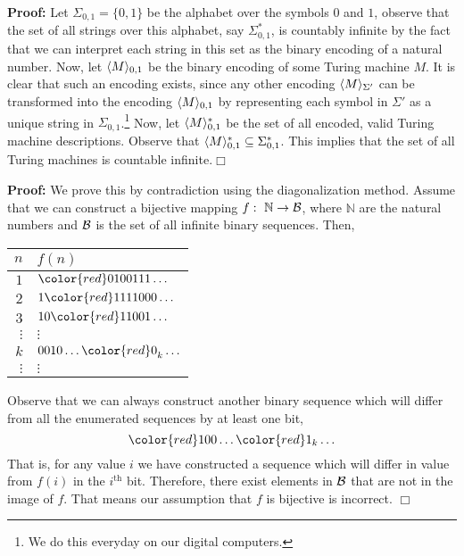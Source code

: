 \documentclass[a4paper,blends,pdf,colorBG,slideColor]{prosper}
\begin{document}

{\bf Proof:}  Let $\Sigma_{0,1} = \{ 0,1\}$ be the alphabet over the symbols $0$ and $1$, observe that the
set of all strings over this alphabet, say $\Sigma_{0,1}^*$, is countably infinite by the fact that
we can interpret each string in this set as the binary encoding of a natural number.
Now, let $\langle {M} \rangle_{0,1}$ be the binary encoding of some Turing machine $M$.  
It is clear that such an encoding exists, since any other encoding $\langle {M} \rangle_{\Sigma'}$
can be transformed into the encoding $\langle {M} \rangle_{0,1}$ by representing each
symbol in $\Sigma'$ as a unique string in $\Sigma_{0,1}$.\footnote{We do this everyday on our digital computers.}
Now, let $\langle {M} \rangle_{0,1}^*$ be the set of all encoded, valid Turing machine descriptions.
Observe that  $\langle {M} \rangle_{0,1}^*\subseteq \Sigma_{0,1}^*$.
This implies that the set of all Turing machines is countable infinite.$\Box$

\vspace{.5in}
\es


{\small
{}
}
{\scriptsize
{\bf Proof:} We prove this by contradiction using the diagonalization method.  Assume that we can construct
a bijective mapping $f\,\colon\; {\mathbb N} \rightarrow {\cal B}$, where $\mathbb N$ are the natural
numbers and $\cal B$ is the set of all infinite binary sequences.  Then,

{\tiny
\begin{center}
\begin{tabular}{r | l}
$n$ & $f(n)$ \\ \hline
$1$ & ${\color{red}0}100111\ldots$\\
$2$ & $1{\color{red}1}111000\ldots$\\
$3$ & $10{\color{red}1}1001\ldots$\\
$\vdots$ & $\vdots$\\
$k$ & $0010\ldots{\color{red}0}_k\ldots$\\
$\vdots$ & $\vdots$\\
\end{tabular}
\end{center}
}
Observe that we can always construct another binary sequence which will differ 
from all the enumerated sequences by at least one bit,
\[
{\color{red} 100}\ldots{\color{red}1_k}\ldots
\]
That is, for any value $i$ we have constructed a sequence which will differ in 
value from $f(i)$ in the $i^{\mbox{th}}$ bit.  Therefore, there exist
elements in $\cal B$ that are not in the image of $f$.  That means
our assumption that $f$ is bijective is incorrect. $\Box$
}
\es
\end{document}
